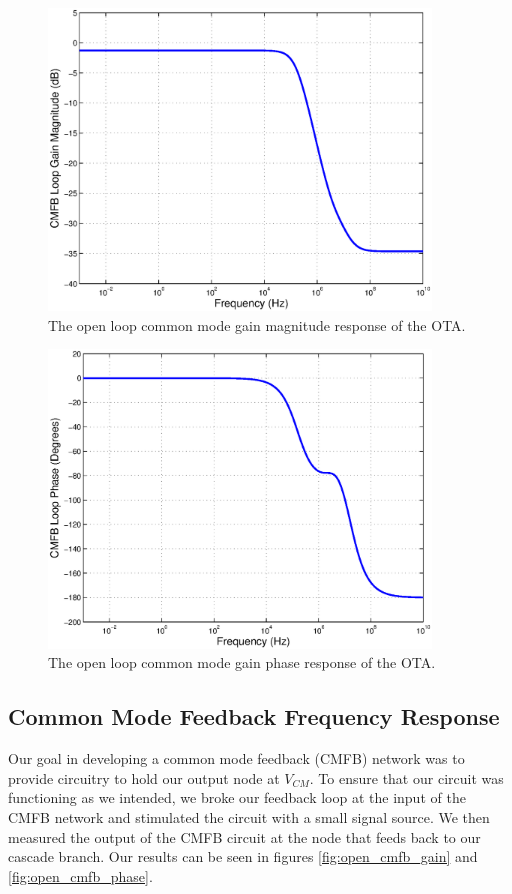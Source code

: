 \documentclass[journal]{IEEEtran}
\begin{document}
\begin{figure}
\centering
\includegraphics[width=4in]{Plots/cmfb_gain.eps}
\caption{The open loop common mode gain magnitude response of the OTA.}
\label{fig:open_cm_gain}
\end{figure}

\begin{figure}
\centering
\includegraphics[width=4in]{Plots/cmfb_phase.eps}
\caption{The open loop common mode gain phase response of the OTA.}
\label{fig:open_cm_phase}
\end{figure}

\subsection{Common Mode Feedback Frequency Response}
Our goal in developing a common mode feedback (CMFB) network was to provide circuitry to hold our output node at $V_{CM}$. To ensure that our circuit was functioning as we intended, we broke our feedback loop at the input of the CMFB network and stimulated the circuit with a small signal source. We then measured the output of the CMFB circuit at the node that feeds back to our cascade branch. Our results can be seen in figures \ref{fig:open_cmfb_gain} and \ref{fig:open_cmfb_phase}.
\end{document}
